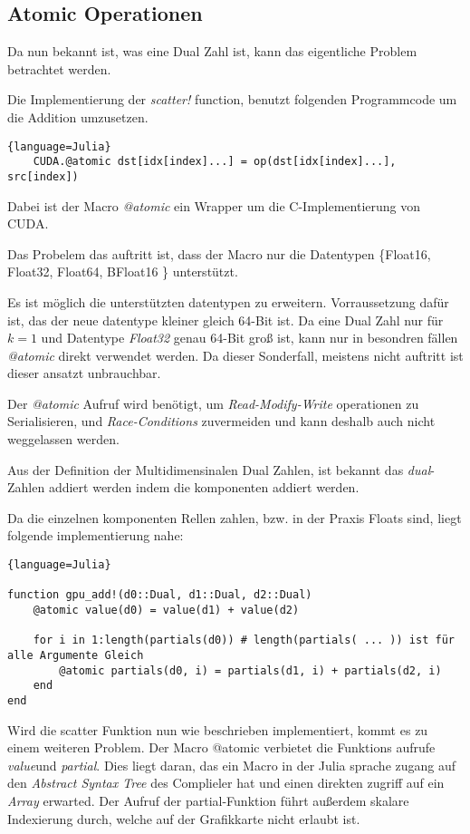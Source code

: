 \subsection{Atomic Operationen} \label{atomic}

Da nun bekannt ist, was eine Dual Zahl ist, 
kann das eigentliche Problem betrachtet werden.

Die Implementierung der \textit{scatter!} function, benutzt folgenden Programmcode um die 
Addition umzusetzen. 

\begin{lstlisting}{language=Julia}
	CUDA.@atomic dst[idx[index]...] = op(dst[idx[index]...], src[index])
\end{lstlisting}


Dabei ist der Macro \textit{@atomic} ein Wrapper um die C-Implementierung von CUDA.

Das Probelem das auftritt ist, dass der Macro nur die Datentypen \{Float16, Float32, Float64, BFloat16 \}
unterstützt.

Es ist möglich die unterstützten datentypen zu erweitern. 
Vorraussetzung dafür ist, das der neue datentype kleiner gleich 64-Bit ist.
Da eine Dual Zahl nur für $k = 1$ und Datentype \textit{Float32} genau 64-Bit groß ist,
kann nur in besondren fällen \textit{@atomic} direkt verwendet werden.
Da dieser Sonderfall, meistens nicht auftritt ist dieser ansatzt unbrauchbar.

Der \textit{@atomic} Aufruf wird benötigt, 
um \textit{Read-Modify-Write} operationen zu Serialisieren, 
und \textit{Race-Conditions} zuvermeiden und kann deshalb auch nicht weggelassen werden.

Aus der Definition der Multidimensinalen Dual Zahlen, ist bekannt das \textit{dual}-Zahlen addiert werden 
indem die komponenten addiert werden.

Da die einzelnen komponenten Rellen zahlen, 
bzw. in der Praxis Floats sind, liegt folgende implementierung nahe:

\begin{lstlisting}{language=Julia}

function gpu_add!(d0::Dual, d1::Dual, d2::Dual)
	@atomic value(d0) = value(d1) + value(d2)
	
	for i in 1:length(partials(d0)) # length(partials( ... )) ist für alle Argumente Gleich
		@atomic partials(d0, i) = partials(d1, i) + partials(d2, i)
	end
end

\end{lstlisting}

Wird die scatter Funktion nun wie beschrieben implementiert, kommt es zu einem weiteren Problem.
Der Macro @atomic verbietet die Funktions aufrufe \textit{value}und \textit{partial}.
Dies liegt daran, das ein Macro in der Julia sprache zugang auf den \textit{Abstract Syntax Tree} des Complieler hat
und einen direkten zugriff auf ein \textit{Array} erwarted.
Der Aufruf der partial-Funktion führt außerdem skalare Indexierung durch, welche auf der Grafikkarte nicht erlaubt ist.

